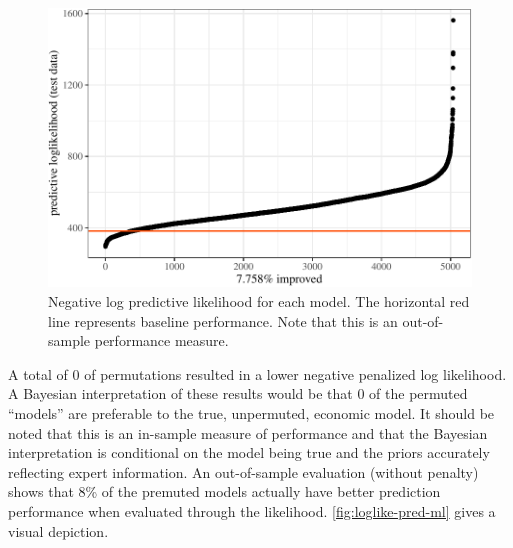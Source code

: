 \documentclass[11pt]{article}
\begin{document}
\begin{figure}[t]

{\centering \includegraphics{gfx/loglike-pred-ml-1} 

}

\caption{Negative log predictive likelihood for each model. The horizontal red line represents baseline performance. Note that this is an out-of-sample performance measure.}\label{fig:loglike-pred-ml}
\end{figure}

A total of 0 of permutations resulted in a lower negative penalized log
likelihood. A Bayesian interpretation of these results would be that 0
of the permuted ``models'' are preferable to the true, unpermuted,
economic model. It should be noted that this is an in-sample measure of
performance and that the Bayesian interpretation is conditional on the
model being true and the priors accurately reflecting expert
information. An out-of-sample evaluation (without penalty) shows that
8\% of the premuted models actually have better prediction performance
when evaluated through the likelihood. \autoref{fig:loglike-pred-ml}
gives a visual depiction.

\begin{table}

\caption{\label{tab:best-results}Series MSEs for SW and top models.}
\centering
{}
\end{table}
\end{document}
